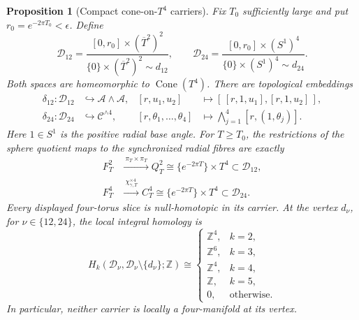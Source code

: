\documentclass[11pt,letterpaper]{article}
\numberwithin{equation}{section}
\newtheorem{proposition}[theorem]{Proposition}
\theoremstyle{definition}
\theoremstyle{remark}
\newcommand{\Z}{\mathbb Z}
\newcommand{\Cone}{\operatorname{Cone}}
\begin{document}
\begin{proposition}[Compact cone-on-\(T^4\) carriers]
\label{prop:compact-T4-carriers}
Fix \(T_0\) sufficiently large and put
\(r_0=e^{-2\pi T_0}<\epsilon\).  Define
\[
 \mathcal D_{12}
 =\frac{[0,r_0]\times(\overline T^2)^2}
 {\{0\}\times(\overline T^2)^2\sim d_{12}},
 \qquad
 \mathcal D_{24}
 =\frac{[0,r_0]\times(S^1)^4}
 {\{0\}\times(S^1)^4\sim d_{24}}.
\]
Both spaces are homeomorphic to \(\Cone(T^4)\).  There are topological
embeddings
\begin{align}
 \delta_{12}:\mathcal D_{12}&\hookrightarrow\mathcal A\wedge\mathcal A,
 &
 [r,u_1,u_2]&\longmapsto
 [\,[r,1,u_1],[r,1,u_2]\,],
 \label{eq:D12-embedding}\\
 \delta_{24}:\mathcal D_{24}&\hookrightarrow\mathcal C^{\wedge4},
 &
 [r,\theta_1,\ldots,\theta_4]&\longmapsto
 \bigwedge_{j=1}^4[r,(1,\theta_j)].
 \label{eq:D24-embedding}
\end{align}
Here \(1\in S^1\) is the positive radial base angle.  For
\(T\geq T_0\), the restrictions of the sphere quotient maps to the
synchronized radial fibres are exactly
\begin{align}
 F_T^2&\xrightarrow{\ \pi_T\times\pi_T\ }Q_T^2
 \cong\{e^{-2\pi T}\}\times T^4\subset\mathcal D_{12},
 \label{eq:D12-slice}\\
 F_T^4&\xrightarrow{\ \chi_{\gamma,T}^{\times4}\ }C_T^4
 \cong\{e^{-2\pi T}\}\times T^4\subset\mathcal D_{24}.
 \label{eq:D24-slice}
\end{align}
Every displayed four-torus slice is null-homotopic in its carrier.  At
the vertex \(d_\nu\), for \(\nu\in\{12,24\}\), the local integral homology
is
\begin{equation}
 H_k(\mathcal D_\nu,\mathcal D_\nu\setminus\{d_\nu\};\Z)
 \cong
 \begin{cases}
  \Z^4,&k=2,\\
  \Z^6,&k=3,\\
  \Z^4,&k=4,\\
  \Z,&k=5,\\
  0,&\text{otherwise}.
 \end{cases}
 \label{eq:carrier-local-homology}
\end{equation}
In particular, neither carrier is locally a four-manifold at its vertex.
\end{proposition}
\end{document}
